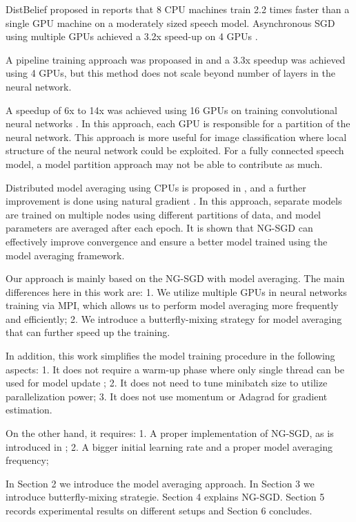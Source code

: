 \documentclass{article}
\begin{document}
DistBelief proposed in \cite{dean2012large} reports that 8 CPU machines train 2.2 times faster than a single GPU machine on a
moderately sized speech model. Asynchronous SGD using multiple GPUs achieved a 3.2x speed-up on 4 GPUs \cite{zhang2013asynchronous}.

A pipeline training approach was propoased in \cite{chen2012pipelined} and a 3.3x speedup was achieved using 4 GPUs, but this
method does not scale beyond number of layers in the neural network.

A speedup of 6x to 14x was achieved using 16 GPUs on training convolutional neural networks \cite{coates2013deep}. In this approach,
each GPU is responsible for a partition of the neural network. This approach is more useful for image classification where 
local structure of the neural network could be exploited. For a fully connected speech model, a model partition approach 
may not be able to contribute as much.

Distributed model averaging using CPUs is proposed in \cite{zhang2014improving}, and a further improvement 
is done using natural gradient \cite{povey2014parallel}. In this approach, separate models are trained on multiple nodes using 
different partitions of data, and model parameters are averaged after each epoch. It is shown that NG-SGD can effectively improve
convergence and ensure a better model trained using the model averaging framework.

Our approach is mainly based on the NG-SGD with model averaging. The main differences here in this work are:
1. We utilize multiple GPUs in neural networks training via MPI, which allows us to perform model averaging more frequently and efficiently;
2. We introduce a butterfly-mixing strategy for model averaging that can further speed up the training.

In addition, this work simplifies the model training procedure in the following aspects:
1. It does not require a warm-up phase where only single thread can be used for model update \cite{seide20141,povey2014parallel};
2. It does not need to tune minibatch size to utilize parallelization power;
3. It does not use momentum or Adagrad\cite{duchi2011adaptive} for gradient estimation.

On the other hand, it requires:
1. A proper implementation of NG-SGD, as is introduced in \cite{povey2014parallel};
2. A bigger initial learning rate and a proper model averaging frequency;

In Section 2 we introduce the model averaging approach. In Section 3 we introduce butterfly-mixing strategie. Section 4 
explains NG-SGD. Section 5 records experimental results on different setups and Section 6 concludes.
\end{document}
